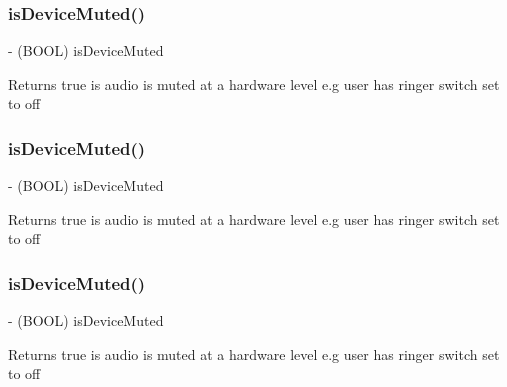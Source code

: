\subsubsection{\texorpdfstring{is\+Device\+Muted()}{isDeviceMuted()}\hspace{0.1cm}{\footnotesize\ttfamily [2/4]}}
{\footnotesize\ttfamily -\/ (B\+O\+OL) is\+Device\+Muted \begin{DoxyParamCaption}{ }\end{DoxyParamCaption}}

Returns true is audio is muted at a hardware level e.\+g user has ringer switch set to off \mbox{\label{interfaceCDAudioManager_a5a4df8bc83cbc6e6723196d3d4ec4974}} 
\subsubsection{\texorpdfstring{is\+Device\+Muted()}{isDeviceMuted()}\hspace{0.1cm}{\footnotesize\ttfamily [3/4]}}
{\footnotesize\ttfamily -\/ (B\+O\+OL) is\+Device\+Muted \begin{DoxyParamCaption}{ }\end{DoxyParamCaption}}

Returns true is audio is muted at a hardware level e.\+g user has ringer switch set to off \mbox{\label{interfaceCDAudioManager_a5a4df8bc83cbc6e6723196d3d4ec4974}} 
\subsubsection{\texorpdfstring{is\+Device\+Muted()}{isDeviceMuted()}\hspace{0.1cm}{\footnotesize\ttfamily [4/4]}}
{\footnotesize\ttfamily -\/ (B\+O\+OL) is\+Device\+Muted \begin{DoxyParamCaption}{ }\end{DoxyParamCaption}}

Returns true is audio is muted at a hardware level e.\+g user has ringer switch set to off \mbox{\label{interfaceCDAudioManager_ab664b34e99f6f3e2158f2df910cf3a95}} 
